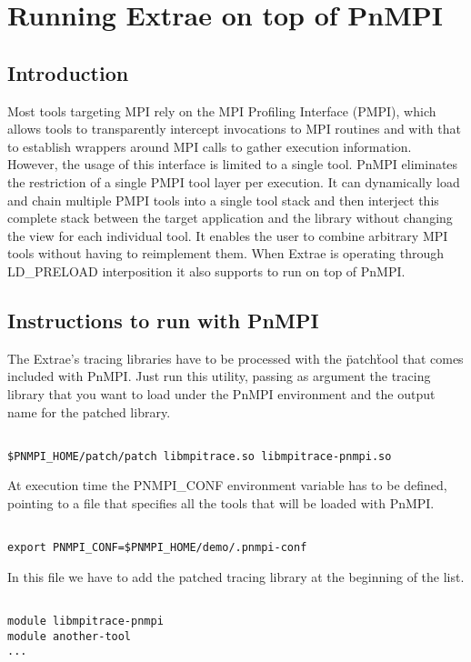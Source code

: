 \chapter{Running Extrae on top of PnMPI}

\section{Introduction}

Most tools targeting MPI rely on the MPI Profiling Interface (PMPI), which allows tools to transparently intercept invocations to 
MPI routines and with that to establish wrappers around MPI calls to gather execution information. However, the usage of this interface 
is limited to a single tool. PnMPI eliminates the restriction of a single PMPI tool layer per execution. It can dynamically load 
and chain multiple PMPI tools into a single tool stack and then interject this complete stack between the target application and the 
library without changing the view for each individual tool. It enables the user to combine arbitrary MPI tools without having to reimplement 
them. When Extrae is operating through LD\_PRELOAD interposition it also supports to run on top of PnMPI.

\section{Instructions to run with PnMPI}

The Extrae's tracing libraries have to be processed with the \"patch\" tool that comes included with PnMPI. Just run this utility, passing as 
argument the tracing library that you want to load under the PnMPI environment and the output name for the patched library. 

\begin{verbatim}

$PNMPI_HOME/patch/patch libmpitrace.so libmpitrace-pnmpi.so

\end{verbatim}

At execution time the PNMPI\_CONF environment variable has to be defined, pointing to a file that specifies all the tools that will be loaded
with PnMPI. 

\begin{verbatim}

export PNMPI_CONF=$PNMPI_HOME/demo/.pnmpi-conf

\end{verbatim}

In this file we have to add the patched tracing library at the beginning of the list.

\begin{verbatim}

module libmpitrace-pnmpi
module another-tool
...

\end{verbatim}

